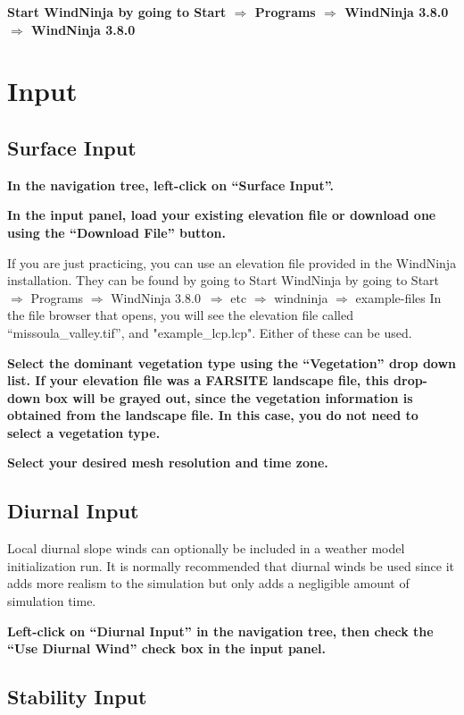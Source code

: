 \documentclass[12pt]{article}
\newcommand\vn{3.8.0}
\begin{document}
\textbf{\color{red}Start WindNinja by going to Start $\Rightarrow$ Programs $\Rightarrow$ WindNinja \vn\ $\Rightarrow$ WindNinja \vn\ }

\section{Input}
\subsection{Surface Input}

\textbf{\color{red} In the navigation tree, left-click on “Surface Input”.}

\textbf{\color{red} In the input panel, load your existing elevation file or download one using the “Download File” button.}

If you are just practicing, you can use an elevation file provided in the WindNinja installation.  They can be found by going to Start WindNinja by going to Start $\Rightarrow$ Programs $\Rightarrow$ WindNinja \vn\ $\Rightarrow$ etc $\Rightarrow$ windninja $\Rightarrow$ example-files  In the file browser that opens, you will see the elevation file called “missoula\_valley.tif”, and "example\_lcp.lcp". Either of these can be used.

\textbf{\color{red} Select the dominant vegetation type using the “Vegetation” drop down list.  If your elevation file was a FARSITE landscape file, this drop-down box will be grayed out, since the vegetation information is obtained from the landscape file.  In this case, you do not need to select a vegetation type.}

\textbf{\color{red} Select your desired mesh resolution and time zone.}

\subsection{Diurnal Input}

Local diurnal slope winds can optionally be included in a weather model initialization run.  It is normally recommended that diurnal winds be used since it adds more realism to the simulation but only adds a negligible amount of simulation time.

\textbf{\color{red} Left-click on “Diurnal Input” in the navigation tree, then check the “Use Diurnal Wind” check box in the input panel.}

\subsection{Stability Input}
\end{document}
